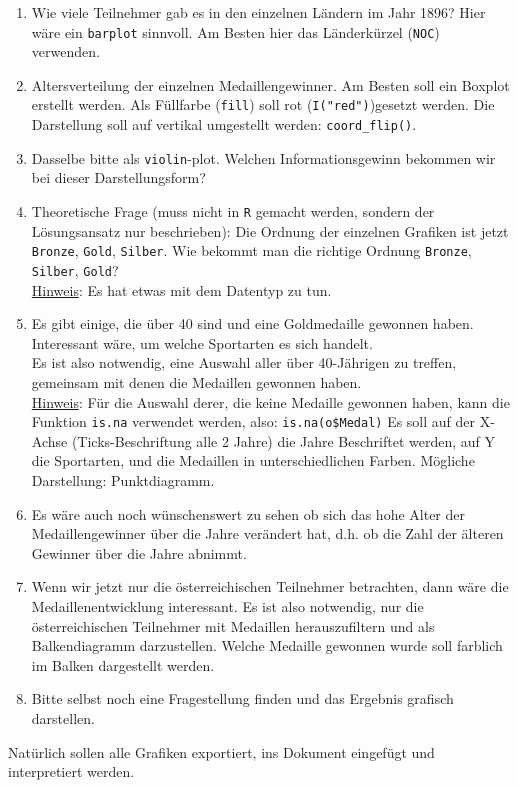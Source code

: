 \documentclass{article}
\begin{document}
\begin{enumerate}
	\item Wie viele Teilnehmer gab es in den einzelnen Ländern im Jahr 1896? Hier wäre ein \texttt{barplot} sinnvoll. Am Besten hier das Länderkürzel (\texttt{NOC}) verwenden.
	\item Altersverteilung der einzelnen Medaillengewinner. Am Besten soll ein Boxplot erstellt werden. Als Füllfarbe (\texttt{fill}) soll rot (\texttt{I("red")})gesetzt werden. Die Darstellung soll auf vertikal umgestellt werden: \texttt{coord\_flip()}.
	\item Dasselbe bitte als \texttt{violin}-plot. Welchen Informationsgewinn bekommen wir bei dieser Darstellungsform?
	\item Theoretische Frage (muss nicht in \texttt{R} gemacht werden, sondern der Lösungsansatz nur beschrieben): Die Ordnung der einzelnen Grafiken ist jetzt \texttt{Bronze}, \texttt{Gold}, \texttt{Silber}. Wie bekommt man die richtige Ordnung \texttt{Bronze},  \texttt{Silber}, \texttt{Gold}? \\ \underline{Hinweis}: Es hat etwas mit dem Datentyp zu tun.
	\item Es gibt einige, die über 40 sind und eine Goldmedaille gewonnen haben. Interessant wäre, um welche Sportarten es sich handelt. \\
	 Es ist also notwendig, eine Auswahl aller über 40-Jährigen zu treffen, gemeinsam mit denen die Medaillen gewonnen haben. \\
	\underline{Hinweis}: Für die Auswahl derer, die keine Medaille gewonnen haben, kann die Funktion \texttt{is.na} verwendet werden, also: \texttt{is.na(o\$Medal)}
	 Es soll auf der X-Achse (Ticks-Beschriftung alle 2 Jahre) die Jahre Beschriftet werden, auf Y die Sportarten, und die Medaillen in unterschiedlichen Farben. Mögliche Darstellung: Punktdiagramm.\\
	 \item Es wäre auch noch wünschenswert zu sehen ob sich das hohe Alter der Medaillengewinner über die Jahre verändert hat, d.h. ob die Zahl der älteren Gewinner über die Jahre abnimmt.
	 \item Wenn wir jetzt nur die österreichischen Teilnehmer betrachten, dann wäre die Medaillenentwicklung interessant. Es ist also notwendig, nur die österreichischen Teilnehmer mit Medaillen herauszufiltern und als Balkendiagramm darzustellen. Welche Medaille gewonnen wurde soll farblich im Balken dargestellt werden.
	 \item Bitte selbst noch eine Fragestellung finden und das Ergebnis grafisch darstellen.
\end{enumerate}


Natürlich sollen alle Grafiken exportiert, ins Dokument eingefügt und interpretiert werden.
\end{document}
